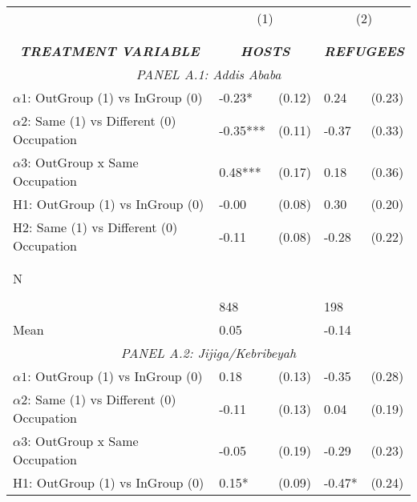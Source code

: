 \begin{tabular}{l*{4}{l}} \toprule 
                &\multicolumn{2}{c}{(1)}&\multicolumn{2}{c}{(2)}\\
                &\multicolumn{2}{c}{ } &\multicolumn{2}{c}{ } \\
\\[-0.6cm] \multicolumn{1}{c}{\textit{\textbf{TREATMENT VARIABLE}}} & \multicolumn{2}{c}{\textit{\textbf{HOSTS}}} & \multicolumn{2}{c}{\textit{\textbf{REFUGEES}}} \\   \multicolumn{5}{c}{\textit{PANEL A.1: Addis Ababa}} \\  \midrule  
$\alpha1$: OutGroup (1) vs InGroup (0)&    -0.23*  &   (0.12)&     0.24   &   (0.23)\\
$\alpha2$: Same (1) vs Different (0) Occupation&    -0.35***&   (0.11)&    -0.37   &   (0.33)\\
 
$\alpha3$: OutGroup x Same Occupation&     0.48***&   (0.17)&     0.18   &   (0.36)\\
 
H1: OutGroup (1) vs InGroup (0)&    -0.00   &   (0.08)&     0.30   &   (0.20)\\
 
H2: Same (1) vs Different (0) Occupation&    -0.11   &   (0.08)&    -0.28   &   (0.22)\\
 
  \\\\[-0.5cm] N \\\\[-0.6cm]&      848   &         &      198   &         \\
Mean            &     0.05&         &    -0.14&         \\
 
  \multicolumn{5}{c}{\textit{PANEL A.2: Jijiga/Kebribeyah}} \\  \midrule  
$\alpha1$: OutGroup (1) vs InGroup (0)&        0.18   &      (0.13)&       -0.35   &      (0.28)\\
$\alpha2$: Same (1) vs Different (0) Occupation&       -0.11   &      (0.13)&        0.04   &      (0.19)\\
 
$\alpha3$: OutGroup x Same Occupation&    -0.05   &   (0.19)&    -0.29   &   (0.23)\\
 
H1: OutGroup (1) vs InGroup (0)&     0.15*  &   (0.09)&    -0.47*  &   (0.24)\\
 

\end{tabular}
